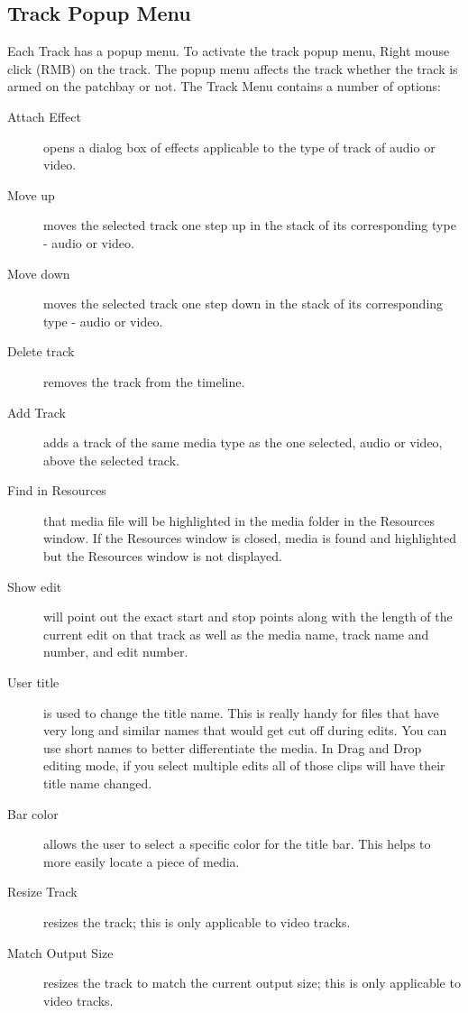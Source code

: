 \subsection{Track Popup Menu}%
\label{sub:track_popup_menu}

Each Track has a popup menu. 
To activate the track popup menu, Right mouse click (RMB) on the track. 
The popup menu affects the track whether the track is armed on the patchbay or not. 
The Track Menu contains a number of options:

\begin{description}
    \item[Attach Effect] opens a dialog box of effects applicable to the type of track of audio or video.
    \item[Move up] moves the selected track one step up in the stack of its corresponding type - audio or video.
    \item[Move down]  moves the selected track one step down in the stack of its corresponding type - audio or video.
    \item[Delete track]  removes the track from the timeline.
    \item[Add Track]  adds a track of the same media type as the one selected, audio or video, above the selected track.
    \item[Find in Resources]  that media file will be highlighted in the media folder in the Resources window. If the 
	Resources window is closed, media is found and highlighted but the Resources window is not displayed.
    \item[Show edit]  will point out the exact start and stop points along with the length of the current edit on
        that track as well as the media name, track name and number, and edit number.
    \item[User title]  is used to change the title name.  This is really handy for files that have very long and
        similar names that would get cut off during edits.  You can use short names to better differentiate the
        media. In Drag and Drop editing mode, if you select multiple edits all of those clips will have
their title name changed.
    \item[Bar color]  allows the user to select a specific color for the title bar.  This helps to more easily locate a piece of media.
    \item[Resize Track]  resizes the track; this is only applicable to video tracks.
    \item[Match Output Size]  resizes the track to match the current output size; this is only applicable to video tracks.
\end{description}



